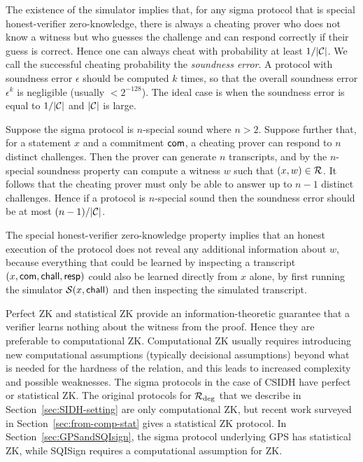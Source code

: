\begin{remark}
The existence of the simulator implies that, for any sigma protocol that is special honest-verifier zero-knowledge, there is always a cheating prover who does not know a witness but who guesses the challenge and can respond correctly if their guess is correct.
Hence one can always cheat with probability at least $1/|\CC|$.
We call the successful cheating probability the \emph{soundness error}.
A protocol with soundness error $\epsilon$ should be computed $k$ times, so that the overall soundness error $\epsilon^k$ is negligible (usually $< 2^{-128}$). 
The ideal case is when the soundness error is equal to $1/|\CC|$ and $|\CC|$ is large.

 Suppose the sigma protocol is $n$-special sound where $n > 2$. Suppose further that, for a statement $x$ and a commitment $\com$, a cheating prover can respond to $n$ distinct challenges. Then the prover can generate $n$ transcripts, and by the $n$-special soundness property can compute a witness $w$ such that $(x,w) \in \Rela$. It follows that the cheating prover must only be able to answer up to $n-1$ distinct challenges. Hence if a protocol is $n$-special sound then the soundness error should be at most $(n-1)/|\CC|$.
\end{remark}

\begin{remark}
The special honest-verifier zero-knowledge property implies that an honest execution of the protocol does not reveal any additional information about $w$, because everything that could be learned by inspecting a transcript $(x,\com,\chall,\resp)$ could also be learned directly from $x$ alone, by first running the simulator $\Sim(x,\chall)$ and then inspecting the simulated transcript. 
\end{remark}

\begin{remark}
Perfect ZK and statistical ZK provide an information-theoretic guarantee that a verifier learns nothing about the witness from the proof. Hence they are preferable to computational ZK.
Computational ZK usually requires introducing new computational assumptions (typically decisional assumptions) beyond what is needed for the hardness of the relation, and this leads to increased complexity and possible weaknesses.
The sigma protocols in the case of CSIDH have perfect or statistical ZK.
The original protocols for $\R[deg]$ that we describe in Section~\ref{sec:SIDH-setting} are only computational ZK, but recent work surveyed in Section~\ref{sec:from-comp-stat} gives a statistical ZK protocol.
In Section~\ref{sec:GPSandSQIsign}, the sigma protocol underlying GPS has statistical ZK, while SQISign requires a computational assumption for ZK.
\end{remark}




